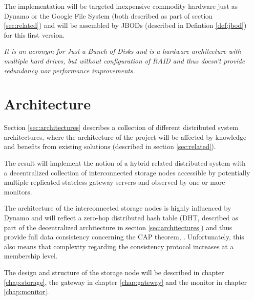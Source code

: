 The implementation will be targeted inexpensive commodity hardware just as \eg Dynamo or the Google File System (both described as part of section \ref{sec:related}) and will be assembled by JBODs (described in Defintion \ref{def:jbod}) for this first version.

\vspace*{3mm}
\begin{definition}[JBOD] \label{def:jbod}
\textit{It is an acronym for Just a Bunch of Disks and is a hardware architecture with multiple hard drives, but without configuration of RAID and thus doesn't provide redundancy nor performance improvements.}
\end{definition}

\section{Architecture}
Section \ref{sec:architectures} describes a collection of different distributed system architectures\cite{Tanenbaum:2006:DSP:1202502}, where the architecture of the project will be affected by knowledge and benefits from existing solutions (described in section \ref{sec:related}). 

The result will implement the notion of a hybrid related distributed system with a decentralized collection of interconnected storage nodes accessible by potentially multiple replicated stateless gateway servers and observed by one or more monitors. 
\newline

The architecture of the interconnected storage nodes is highly influenced by Dynamo and will reflect a zero-hop distributed hash table (DHT, described as part of the decentralized architecture in section \ref{sec:architectures}) and thus provide full data consistency concerning the CAP theorem, . Unfortunately, this also means that complexity regarding the consistency protocol increases at a membership level.


The design and structure of the storage node will be described in chapter \ref{chap:storage}, the gateway in chapter \ref{chap:gateway} and the monitor in chapter \ref{chap:monitor}.

